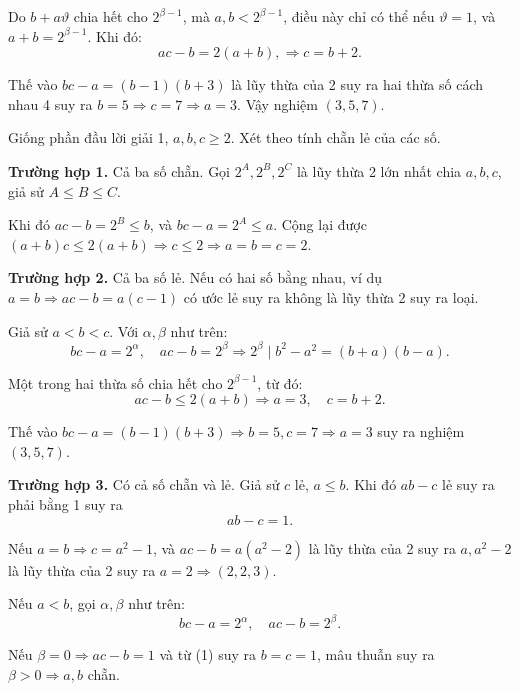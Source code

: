 \begin{problem}
\begin{soln}
    Do \( b + a\vartheta \) chia hết cho \( 2^{\beta - 1} \), mà \( a, b < 2^{\beta - 1} \),
    điều này chỉ có thể nếu \( \vartheta = 1 \), và \( a + b = 2^{\beta - 1} \). Khi đó:
    \[
        ac - b = 2(a + b), \Rightarrow c = b + 2.
    \]

    Thế vào \( bc - a = (b - 1)(b + 3) \) là lũy thừa của 2 suy ra hai thừa số cách nhau 4
    suy ra \( b = 5 \Rightarrow c = 7 \Rightarrow a = 3 \). Vậy nghiệm \( (3, 5, 7) \).
\end{soln}

\begin{soln}
    Giống phần đầu lời giải 1, \( a, b, c \ge 2 \). Xét theo tính chẵn lẻ của các số.

    \textbf{Trường hợp 1.} Cả ba số chẵn. Gọi \( 2^A, 2^B, 2^C \) là lũy thừa 2 lớn nhất chia \( a, b, c \), giả sử \( A \le B \le C \).

    Khi đó \( ac - b = 2^B \le b \), và \( bc - a = 2^A \le a \). Cộng lại được \( (a + b)c \le 2(a + b) \Rightarrow c \le 2 \Rightarrow a = b = c = 2 \).

    \textbf{Trường hợp 2.} Cả ba số lẻ. Nếu có hai số bằng nhau, ví dụ \( a = b \Rightarrow ac - b = a(c - 1) \) có ước lẻ suy ra không là lũy thừa 2 suy ra loại.

    Giả sử \( a < b < c \). Với \( \alpha, \beta \) như trên:
    \[
        bc - a = 2^\alpha, \quad ac - b = 2^\beta \Rightarrow 2^\beta \mid b^2 - a^2 = (b + a)(b - a).
    \]

    Một trong hai thừa số chia hết cho \( 2^{\beta - 1} \), từ đó:
    \[
        ac - b \le 2(a + b) \Rightarrow a = 3, \quad c = b + 2.
    \]
    
    Thế vào \( bc - a = (b - 1)(b + 3) \Rightarrow b = 5, c = 7 \Rightarrow a = 3 \) suy ra nghiệm \( (3, 5, 7) \).

    \textbf{Trường hợp 3.} Có cả số chẵn và lẻ. Giả sử \( c \) lẻ, \( a \le b \). Khi đó \( ab - c \) lẻ suy ra phải bằng 1 suy ra
    \[
        ab - c = 1. \tag{1}
    \]

    Nếu \( a = b \Rightarrow c = a^2 - 1 \), và \( ac - b = a(a^2 - 2) \) là lũy thừa của 2
    suy ra \( a, a^2 - 2 \) là lũy thừa của 2 suy ra \( a = 2 \Rightarrow (2, 2, 3) \).

    Nếu \( a < b \), gọi \( \alpha, \beta \) như trên:
    \[
        bc - a = 2^\alpha, \quad ac - b = 2^\beta. \tag{2}
    \]

    Nếu \( \beta = 0 \Rightarrow ac - b = 1 \) và từ (1) suy ra \( b = c = 1 \), mâu thuẫn suy ra \( \beta > 0 \Rightarrow a, b \) chẵn.


\end{soln}
\end{problem}
